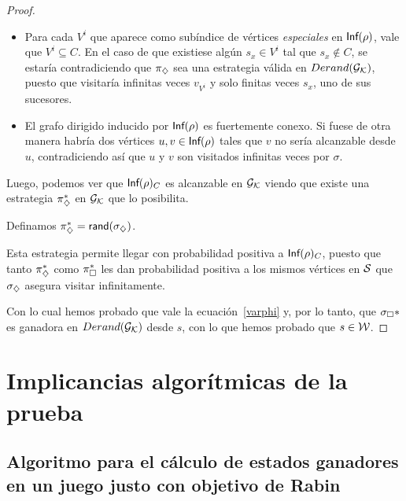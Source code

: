 \begin{proof}

	\begin{itemize}
		\item Para cada $V^i$ que aparece como subíndice de vértices \textit{especiales} en
		      $\textsf{Inf}(\rho)$, vale que $V^i \subseteq C$. En el caso de que existiese algún
		      $s_x \in V^i$ tal que $s_x \notin C$, se estaría contradiciendo que $\pi_\diamondsuit$
		      sea una estrategia válida en $Derand(\mathcal{G}_{\mathcal{K}})$, puesto que visitaría infinitas veces
		      $v_{V^i}$ y solo finitas veces $s_x$, uno de sus sucesores.
		\item El grafo dirigido inducido por $\textsf{Inf}(\rho)$ es fuertemente conexo. Si fuese de
		      otra manera habría dos vértices $u, v \in \textsf{Inf}(\rho)$ tales que $v$ no sería
		      alcanzable desde $u$, contradiciendo así que $u$ y $v$ son visitados infinitas
		      veces por $\sigma$.
	\end{itemize}

	Luego, podemos ver que $\textsf{Inf}(\rho)_C$ es alcanzable en $\mathcal{G}_{\mathcal{K}}$ viendo que existe
	una estrategia $\pi_\diamondsuit^*$ en $\mathcal{G}_{\mathcal{K}}$ que lo posibilita.

	Definamos $\pi_\diamondsuit^* = \textsf{rand}(\sigma_\diamondsuit)$.

	Esta estrategia permite llegar con probabilidad positiva a $\textsf{Inf}(\rho)_C$,
	puesto que tanto $\pi_\diamondsuit^*$ como $\pi_\square^*$ les dan probabilidad positiva a
	los mismos vértices en $\mathcal{S}$ que $\sigma_\diamondsuit$ asegura visitar infinitamente.

	Con lo cual hemos probado que vale la ecuación~\ref{varphi} y, por lo tanto,
	que $\sigma_\square*$ es ganadora en $Derand(\mathcal{G}_{\mathcal{K}})$ desde $s$, con lo que hemos probado
	que $s \in \mathcal{W}$.

\end{proof}

\section{Implicancias algorítmicas de la prueba}

\subsection*{Algoritmo para el cálculo de estados ganadores en un juego justo con objetivo de Rabin}

